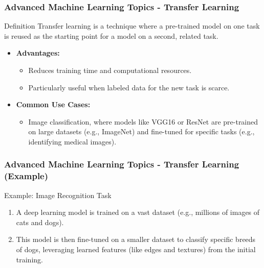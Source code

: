 \documentclass[aspectratio=169]{beamer}
\begin{document}
\begin{frame}[fragile]
  \frametitle{Advanced Machine Learning Topics - Transfer Learning}
  \begin{block}{Definition}
    Transfer learning is a technique where a pre-trained model on one task is reused as the starting point for a model on a second, related task.
  \end{block}
  
  \begin{itemize}
    \item \textbf{Advantages:}
      \begin{itemize}
        \item Reduces training time and computational resources.
        \item Particularly useful when labeled data for the new task is scarce.
      \end{itemize}
    
    \item \textbf{Common Use Cases:} 
      \begin{itemize}
        \item Image classification, where models like VGG16 or ResNet are pre-trained on large datasets (e.g., ImageNet) and fine-tuned for specific tasks (e.g., identifying medical images).
      \end{itemize}
  \end{itemize}
\end{frame}

\begin{frame}[fragile]
  \frametitle{Advanced Machine Learning Topics - Transfer Learning (Example)}
  \begin{block}{Example: Image Recognition Task}
    \begin{enumerate}
      \item A deep learning model is trained on a vast dataset (e.g., millions of images of cats and dogs).
      \item This model is then fine-tuned on a smaller dataset to classify specific breeds of dogs, leveraging learned features (like edges and textures) from the initial training.
    \end{enumerate}
  \end{block}
\end{frame}
\end{document}
